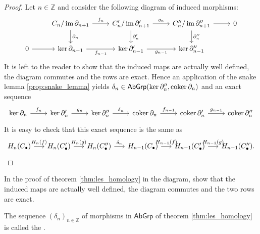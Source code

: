 \begin{proof}
	Let $n \in \mathbb{Z}$ and consider the following diagram of induced morphisms:
	\begin{equation*}
		\begin{tikzcd}
			& C_n/\im\partial_{n + 1} \arrow[r,"f_n"]\arrow[d,"\partial_n"] & C_n'/\im\partial'_{n + 1} \arrow[r,"g_n"]\arrow[d,"\partial'_n"] & C_n''/\im\partial_{n + 1}'' \arrow[r]\arrow[d,"\partial''_n"] & 0\\
			0 \arrow[r] & \ker \partial_{n - 1} \arrow[r,"f_{n - 1}"'] & \ker \partial_{n - 1}' \arrow[r,"g_{n - 1}"'] & \ker\partial_{n - 1}''
		\end{tikzcd}		
	\end{equation*}
	It is left to the reader to show that the induced maps are actually well defined, the diagram commutes and the rows are exact. Hence an application of the snake lemma \ref{prop:snake_lemma} yields $\delta_n \in \mathsf{AbGrp}(\ker \partial_n'',\operatorname{coker} \partial_n)$ and an exact sequence
	\begin{equation*}
		\begin{tikzcd}
			\ker \partial_n \arrow[r,"f_n"] & \ker \partial_n' \arrow[r,"g_n"] & \ker \partial_n'' \arrow[r,"\delta_n"] & \coker \partial_n \arrow[r,"f_{n - 1}"] & \coker \partial_n' \arrow[r,"g_{n - 1}"] & \coker \partial_n''
		 \end{tikzcd}
	\end{equation*}
	It is easy to check that this exact sequence is the same as
	\begin{equation*}
		\begin{tikzcd}[column sep=3.5ex]
			H_n(C_\bullet) \arrow[r,"H_n(f)"] & H_n(C'_\bullet) \arrow[r,"H_n(g)"] & H_n(C''_\bullet) \arrow[r,"\delta_n"] & H_{n - 1}(C_\bullet) \arrow[r,"H_{n-1}(f)"] & H_{n - 1}(C_\bullet') \arrow[r,"H_{n-1}(g)"] & H_{n - 1}(C_\bullet'').
		 \end{tikzcd}
	\end{equation*}
\end{proof}

\begin{exercise}
	In the proof of theorem \ref{thm:les_homology} in the diagram, show that the induced maps are actually well defined, the diagram commutes and the two rows are exact.
\end{exercise}

\begin{definition}
	The sequence $(\delta_n)_{n \in \mathbb{Z}}$ of morphisms in $\mathsf{AbGrp}$ of theorem \ref{thm:les_homology} is called the .
\end{definition}

